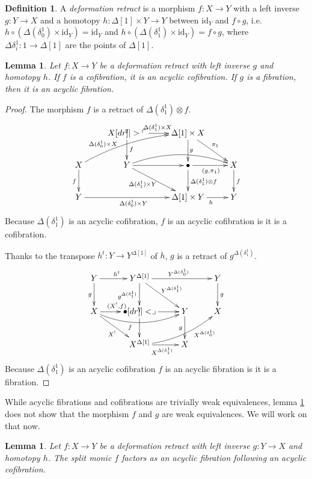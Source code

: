 \documentclass{amsart}
\theoremstyle{plain}
\newtheorem{lemma}[theorem]{Lemma}
\theoremstyle{definition}
\newtheorem{defin}[theorem]{Definition}
\newcommand\id{\mathrm{id}}
\begin{document}
\begin{defin} A \emph{deformation retract} is a morphism $f:X\to Y$ with a left inverse $g:Y\to X$ and a homotopy $h:\Delta[1]\times Y\to Y$ between $\id_Y$ and $f\circ g$, i.e.\ $h\circ (\Delta(\delta^1_0)\times \id_Y) = \id_Y$ and $h\circ (\Delta(\delta^1_1)\times \id_Y) = f\circ g$, where $\Delta\delta^1_i:1\to \Delta[1]$ are the points of $\Delta[1]$. %
\end{defin}

\begin{lemma} Let $f:X\to Y$ be a deformation retract with left inverse $g$ and homotopy $h$. If $f$ is a cofibration, it is an acyclic cofibration. If $g$ is a fibration, then it is an acyclic fibration. \label{drisac}\end{lemma}

\begin{proof} The morphism $f$ is a retract of $\Delta(\delta^1_1)\otimes f$.
\[\xymatrix{
&X \ar[r]^{\Delta(\delta^1_1)\times X}\ar[d]^f\po & \Delta[1]\times X \ar[dr]^{\pi_1} \ar[d] \\
X\ar[d]_f \ar@/^2ex/[urr]^(.3){\Delta(\delta^1_0)\times X} &Y \ar[r]\ar[dr]_(.4){\Delta(\delta^1_1)\times Y} \ar@/^3ex/[rr]^(.6)g & \bullet \ar[d]^{\Delta(\delta^1_1)\otimes f} \ar[r]_{(g,\pi_1)} & X\ar[d]^f \\
Y\ar[rr]_{\Delta(\delta^1_0)\times Y}&  & \Delta[1]\times Y \ar[r]_{h} & Y
}\]
Because $\Delta(\delta^1_1)$ is an acyclic cofibration, $f$ is an acyclic cofibration is it is a cofibration.

Thanks to the transpose $h^t:Y\to Y^{\Delta[1]}$ of $h$, $g$ is a retract of $g^{\Delta(\delta^1_1)}$.
\[\xymatrix{
Y\ar[d]_g \ar[r]^{h^t} & Y^{\Delta[1]} \ar[d]_{g^{\Delta(\delta^1_1)}} \ar[dr]^{Y^{\Delta(\delta^1_1)}} \ar[rr]^{Y^{\Delta(\delta^1_0)}}&& Y \ar[d]^g\\
X \ar[r]^{(X^\bang,f)} \ar[dr]_{X^\bang} \ar@/_3ex/[rr]_(.4)f & \bullet\ar[r]\ar[d]\pb & Y \ar[d]_g & X \\
& X^{\Delta[1]} \ar[r]_{X^{\Delta(\delta_1^1)}} \ar@/_2ex/[urr]_(.7){X^{\Delta(\delta^1_0)}}& X
}\]
Because $\Delta(\delta^1_1)$ is an acyclic cofibration $f$ is an acyclic fibration is it is a fibration.
\end{proof}

While acyclic fibrations and cofibrations are trivially weak equivalences, lemma \ref{drisac} does not show that the morphism $f$ and $g$ are weak equivalences. We will work on that now.

\begin{lemma} Let $f:X\to Y$ be a deformation retract with left inverse $g:Y\to X$ and homotopy $h$. The split monic $f$ factors as an acyclic fibration following an acyclic cofibration. \label{driswe} \end{lemma}
\end{document}
